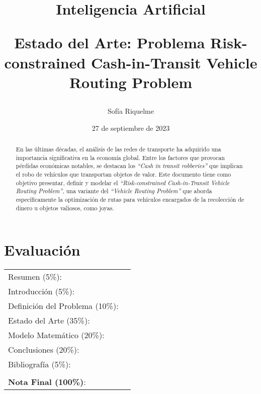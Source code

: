 \documentclass[letter, 10pt]{article}
\begin{document}
\title{Inteligencia Artificial \\ \begin{Large}Estado del Arte: Problema Risk-constrained Cash-in-Transit Vehicle Routing Problem\end{Large}}
\author{Sof\'ia Riquelme}
\date{27 de septiembre de 2023}
\maketitle

\section*{Evaluaci\'on}

\begin{tabular}{ll}
Resumen (5\%): & \underline{\hspace{2cm}} \\
Introducci\'on (5\%):  & \underline{\hspace{2cm}} \\
Definici\'on del Problema (10\%):  & \underline{\hspace{2cm}} \\
Estado del Arte (35\%):  & \underline{\hspace{2cm}} \\
Modelo Matem\'atico (20\%): &  \underline{\hspace{2cm}}\\
Conclusiones (20\%): &  \underline{\hspace{2cm}}\\
Bibliograf\'ia (5\%): & \underline{\hspace{2cm}}\\
 &  \\
\textbf{Nota Final (100\%)}:   & \underline{\hspace{2cm}}
\end{tabular}
\vspace{2cm}

\begin{abstract}
En las últimas décadas, el análisis de las redes de transporte ha adquirido una importancia significativa en la economía global. Entre los factores que provocan pérdidas económicas notables, se destacan los \textit{``Cash in transit robberies''} que implican el robo de vehículos que transportan objetos de valor. Este documento tiene como objetivo presentar, definir y modelar el \textit{``Risk-constrained Cash-in-Transit Vehicle Routing Problem''}, una variante del \textit{``Vehicle Routing Problem''} que aborda específicamente la optimización de rutas para vehículos encargados de la recolección de dinero u objetos valiosos, como joyas.
\end{abstract}
\end{document}
